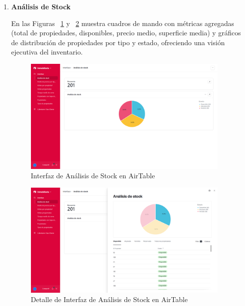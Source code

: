 \begin{enumerate}

    \item \textbf{Análisis de Stock}

    En las Figuras ~\ref{fig:interfazairtableanalisisstock} y ~\ref{fig:interfazairtableanalisisstockdetalle} muestra cuadros de mando con métricas agregadas (total de propiedades, disponibles, precio medio, superficie media) y gráficos de distribución de propiedades por tipo y estado, ofreciendo una visión ejecutiva del inventario.

    \begin{figure}[H]
        \begin{center}
            \includegraphics[width = 0.95\textwidth]{Figuras/interfazairtableanalisisstock.png}
        \end{center}
        \caption{\label{fig:interfazairtableanalisisstock} Interfaz de Análisis de Stock en AirTable}
    \end{figure}

    \begin{figure}[H]
        \begin{center}
            \includegraphics[width = 0.95\textwidth]{Figuras/interfazairtableanalisisstockdetalle.png}
        \end{center}
        \caption{\label{fig:interfazairtableanalisisstockdetalle} Detalle de Interfaz de Análisis de Stock en AirTable}
    \end{figure}


\end{enumerate}
